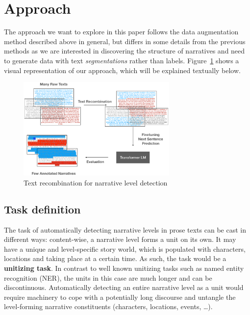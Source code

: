 \documentclass[10pt, a4paper]{article}
\begin{document}
\section{Approach}
\label{sec:workflow}

The approach we want to explore in this paper follows the  data augmentation method described above in general, but differs in some details from the previous methods as we are interested in discovering the structure of narratives and need to generate data with text \textit{segmentations} rather than labels. Figure~\ref{fig:workflow} shows a visual representation of our approach, which will be explained textually below.

\begin{figure}
    \centering
    \includegraphics[width=0.7\textwidth]{workflow.ps}
    \vspace{-1.5cm}
    \caption{Text recombination for narrative level detection}
    \label{fig:workflow}
\end{figure}



\subsection{Task definition}
\label{subsec:task}

The task of automatically detecting narrative levels in prose texts can be cast in different ways: content-wise, a narrative level forms a unit on its own. It may have a unique and level-specific story world, which is populated with characters, locations and taking place at a certain time. As such, the task would be a \textbf{unitizing task}. In contrast to well known unitizing tasks such as named entity recognition (NER), the units in this case are much longer and can be discontinuous. Automatically detecting an entire narrative level as a unit would require machinery to cope with a potentially long discourse and untangle the level-forming narrative constituents (characters, locations, events, \dots). 
\end{document}
